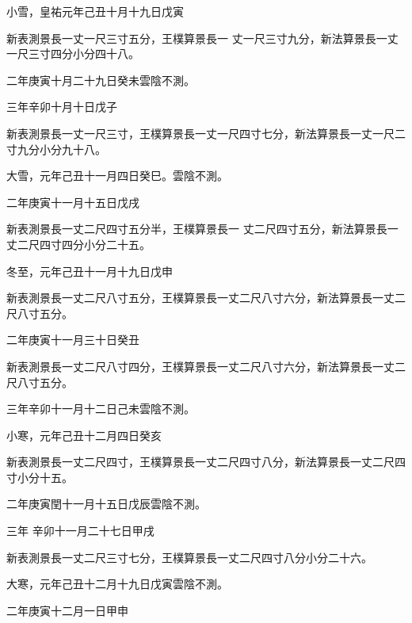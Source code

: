 \begin{pinyinscope}
 小雪，皇祐元年己丑十月十九日戊寅



 新表測景長一丈一尺三寸五分，王樸算景長一
 丈一尺三寸九分，新法算景長一丈一尺三寸四分小分四十八。



 二年庚寅十月二十九日癸未雲陰不測。



 三年辛卯十月十日戊子



 新表測景長一丈一尺三寸，王樸算景長一丈一尺四寸七分，新法算景長一丈一尺二寸九分小分九十八。



 大雪，元年己丑十一月四日癸巳。雲陰不測。



 二年庚寅十一月十五日戊戌



 新表測景長一丈二尺四寸五分半，王樸算景長一
 丈二尺四寸五分，新法算景長一丈二尺四寸四分小分二十五。



 冬至，元年己丑十一月十九日戊申



 新表測景長一丈二尺八寸五分，王樸算景長一丈二尺八寸六分，新法算景長一丈二尺八寸五分。



 二年庚寅十一月三十日癸丑



 新表測景長一丈二尺八寸四分，王樸算景長一丈二尺八寸六分，新法算景長一丈二尺八寸五分。



 三年辛卯十一月十二日己未雲陰不測。



 小寒，元年己丑十二月四日癸亥



 新表測景長一丈二尺四寸，王樸算景長一丈二尺四寸八分，新法算景長一丈二尺四寸小分十五。



 二年庚寅閏十一月十五日戊辰雲陰不測。



 三年
 辛卯十一月二十七日甲戌



 新表測景長一丈二尺三寸七分，王樸算景長一丈二尺四寸八分小分二十六。



 大寒，元年己丑十二月十九日戊寅雲陰不測。



 二年庚寅十二月一日甲申




\end{pinyinscope}
